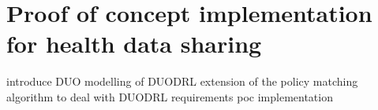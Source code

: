 \section{Proof of concept implementation for health data sharing}
\label{sec:poc_health}

introduce DUO
modelling of DUODRL
extension of the policy matching algorithm to deal with DUODRL requirements
poc implementation